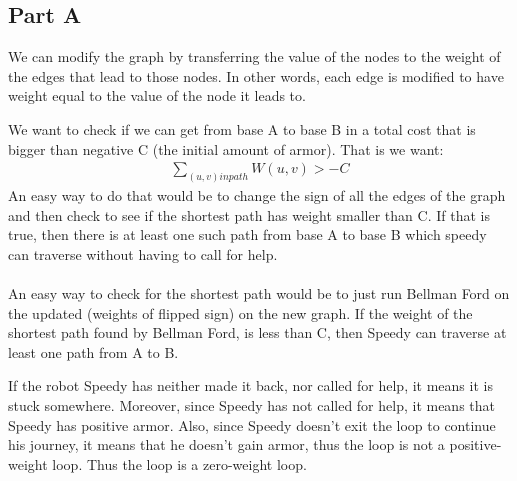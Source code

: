 \documentclass[12pt,twoside]{article}
\begin{document}

\begin{problems}

\section*{Part A}

\problem  %

\begin{problemparts}
\problempart We can modify the graph by transferring the value of the nodes to the weight of the edges that lead to those nodes. In other words, each edge is modified to have weight equal to the value of the node it leads to.

\problempart We want to check if we can get from base A to base B in a total cost that is bigger than negative C (the initial amount of armor). That is we want: 
\begin{align*}
\sum_{(u,v)in path}W(u,v) > -C
\end{align*}
An easy way to do that would be to change the sign of all the edges of the graph and then check to see if the shortest path has weight smaller than C. If that is true, then there is at least one such path from base A to base B which speedy can traverse without having to call for help.
\\\\
An easy way to check for the shortest path would be to just run Bellman Ford on the updated (weights of flipped sign) on the new graph. If the weight of the shortest path found by Bellman Ford, is less than C, then Speedy can traverse at least one path from A to B.  

\problempart If the robot Speedy has neither made it back, nor called for help, it means it is stuck somewhere. Moreover, since Speedy has not called for help, it means that Speedy has positive armor. Also, since Speedy doesn't exit the loop to continue his journey, it means that he doesn't gain armor, thus the loop is not a positive-weight loop. Thus the loop is a zero-weight loop.


\end{problemparts}
\end{problems}
\end{document}
